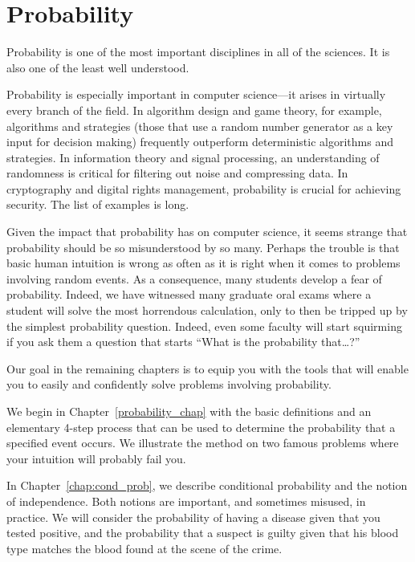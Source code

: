 \part{Probability}
\label{part:probability}

\partintro

Probability is one of the most important disciplines in all of the
sciences.  It is also one of the least well understood.

Probability is especially important in computer science---it arises in
virtually every branch of the field.  In algorithm design and game
theory, for example,  algorithms and strategies
(those that use a random number generator as a key input for decision
making) frequently outperform deterministic algorithms and
strategies.  In information theory and signal processing, an
understanding of randomness is critical for filtering out noise and
compressing data.  In cryptography and digital rights management,
probability is crucial for achieving security.  The list of examples
is long.

Given the impact that probability has on computer science, it seems
strange that probability should be so misunderstood by so many.
Perhaps the trouble is that basic human intuition is wrong as often as
it is right when it comes to problems involving random events.  As a
consequence, many students develop a fear of probability.  Indeed, we
have witnessed many graduate oral exams where a student will solve the
most horrendous calculation, only to then be tripped up by the simplest
probability question.  Indeed, even some faculty will start squirming
if you ask them a question that starts ``What is the probability
that\dots?''

Our goal in the remaining chapters is to equip you with the tools that
will enable you to easily and confidently solve problems involving
probability.

We begin in Chapter~\ref{probability_chap} with the basic definitions
and an elementary 4-step process that can be used to determine the
probability that a specified event occurs.  We illustrate the method
on two famous problems where your intuition will probably fail you.

In Chapter~\ref{chap:cond_prob}, we describe conditional probability and
the notion of independence.  Both notions are important, and sometimes
misused, in practice.  We will consider the probability of having a
disease given that you tested positive, and the probability that a
suspect is guilty given that his blood type matches the blood found at
the scene of the crime.

